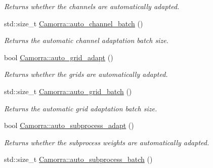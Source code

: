 \begin{DoxyCompactItemize}
\begin{DoxyCompactList}\small\item\em Returns whether the channels are automatically adapted. \end{DoxyCompactList}\item 
\hypertarget{a00798_a1d0ec0f5dcd474956fb1e545c277329f}{
std::size\_\-t \hyperlink{a00798_a1d0ec0f5dcd474956fb1e545c277329f}{Camorra::auto\_\-channel\_\-batch} ()}
\label{a00798_a1d0ec0f5dcd474956fb1e545c277329f}

\begin{DoxyCompactList}\small\item\em Returns the automatic channel adaptation batch size. \end{DoxyCompactList}\item 
\hypertarget{a00798_a3eb8fdc33ee9ad8abe5a6d34f618d728}{
bool \hyperlink{a00798_a3eb8fdc33ee9ad8abe5a6d34f618d728}{Camorra::auto\_\-grid\_\-adapt} ()}
\label{a00798_a3eb8fdc33ee9ad8abe5a6d34f618d728}

\begin{DoxyCompactList}\small\item\em Returns whether the grids are automatically adapted. \end{DoxyCompactList}\item 
\hypertarget{a00798_a05dbff54114523243a557bbb5926318c}{
std::size\_\-t \hyperlink{a00798_a05dbff54114523243a557bbb5926318c}{Camorra::auto\_\-grid\_\-batch} ()}
\label{a00798_a05dbff54114523243a557bbb5926318c}

\begin{DoxyCompactList}\small\item\em Returns the automatic grid adaptation batch size. \end{DoxyCompactList}\item 
\hypertarget{a00798_a7bdb9a311256e2eccd7226388eb134b9}{
bool \hyperlink{a00798_a7bdb9a311256e2eccd7226388eb134b9}{Camorra::auto\_\-subprocess\_\-adapt} ()}
\label{a00798_a7bdb9a311256e2eccd7226388eb134b9}

\begin{DoxyCompactList}\small\item\em Returns whether the subprocess weights are automatically adapted. \end{DoxyCompactList}\item 
\hypertarget{a00798_a2a61f1f6ed9e6d02037901d43011778f}{
std::size\_\-t \hyperlink{a00798_a2a61f1f6ed9e6d02037901d43011778f}{Camorra::auto\_\-subprocess\_\-batch} ()}
\label{a00798_a2a61f1f6ed9e6d02037901d43011778f}


\end{DoxyCompactItemize}
